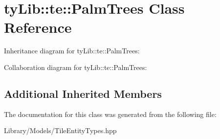 \hypertarget{classty_lib_1_1te_1_1_palm_trees}{}\section{ty\+Lib\+:\+:te\+:\+:Palm\+Trees Class Reference}
\label{classty_lib_1_1te_1_1_palm_trees}


Inheritance diagram for ty\+Lib\+:\+:te\+:\+:Palm\+Trees\+:


Collaboration diagram for ty\+Lib\+:\+:te\+:\+:Palm\+Trees\+:
\subsection*{Additional Inherited Members}


The documentation for this class was generated from the following file\+:\begin{DoxyCompactItemize}
\item 
Library/\+Models/Tile\+Entity\+Types.\+hpp\end{DoxyCompactItemize}

